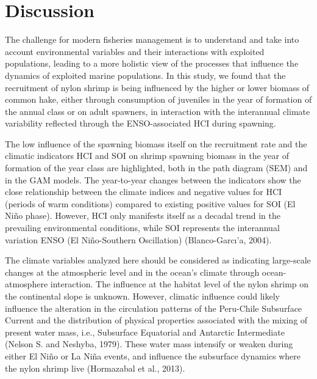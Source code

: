 \documentclass[12pt]{article}
\begin{document}
\hypertarget{discussion}{%
\section{Discussion}\label{discussion}}

The challenge for modern fisheries management is to understand and take
into account environmental variables and their interactions with
exploited populations, leading to a more holistic view of the processes
that influence the dynamics of exploited marine populations. In this
study, we found that the recruitment of nylon shrimp is being influenced
by the higher or lower biomass of common hake, either through
consumption of juveniles in the year of formation of the annual class or
on adult spawners, in interaction with the interannual climate
variability reflected through the ENSO-associated HCI during spawning.

The low influence of the spawning biomass itself on the recruitment rate
and the climatic indicators HCI and SOI on shrimp spawning biomass in
the year of formation of the year class are highlighted, both in the
path diagram (SEM) and in the GAM models. The year-to-year changes
between the indicators show the close relationship between the climate
indices and negative values for HCI (periods of warm conditions)
compared to existing positive values for SOI (El Niño phase). However,
HCI only manifests itself as a decadal trend in the prevailing
environmental conditions, while SOI represents the interannual variation
ENSO (El Niño-Southern Oscillation) (Blanco-Garcı'a, 2004).

The climate variables analyzed here should be considered as indicating
large-scale changes at the atmospheric level and in the ocean's climate
through ocean-atmosphere interaction. The influence at the habitat level
of the nylon shrimp on the continental slope is unknown. However,
climatic influence could likely influence the alteration in the
circulation patterns of the Peru-Chile Subsurface Current and the
distribution of physical properties associated with the mixing of
present water mass, i.e., Subsurface Equatorial and Antarctic
Intermediate (Nelson S. and Neshyba, 1979). These water mass intensify
or weaken during either El Niño or La Niña events, and influence the
subsurface dynamics where the nylon shrimp live (Hormazabal et al.,
2013).
\end{document}
